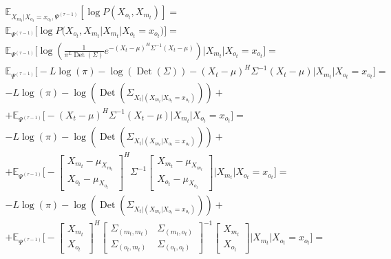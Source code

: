 \documentclass[11pt]{article}
\newcommand{\Expect}{\mathbb{E}}
\DeclareMathOperator{\Det}{Det}
\begin{document}
\begin{equation*}
\begin{gathered}
\Expect_{X_{m_t}|X_{o_t}=x_{o_t}, \Psi^{(\tau-1)}}[\log P(X_{o_t}, X_{m_t})]=\\
\Expect_{\Psi^{(\tau-1)}}\Big[\log P\Big(X_{o_t}, X_{m_t}\Big|X_{m_t}|X_{o_t}=x_{o_t}\Big)\Big]=\\
\Expect_{\Psi^{(\tau-1)}}\bigg[\log \left(\frac{1}{\pi^{L}\Det(\Sigma)}e^{-(X_t-\mu)^H\Sigma^{-1}(X_t-\mu)}\right)\Big|X_{m_t}|X_{o_t}=x_{o_t}\bigg]=\\
\Expect_{\Psi^{(\tau-1)}}\bigg[-L \log(\pi) - \log (\Det(\Sigma)) - (X_t - \mu)^H\Sigma^{-1}(X_t - \mu)\Big|X_{m_t}|X_{o_t}=x_{o_t}\bigg]=\\
-L \log(\pi) - \log (\Det(\Sigma_{X_t|(X_{m_t}|X_{o_t}=x_{o_t})})) + \\ + \Expect_{\Psi^{(\tau-1)}}\bigg[- (X_t - \mu)^H\Sigma^{-1}(X_t - \mu)\Big|X_{m_t}|X_{o_t}=x_{o_t}\bigg]=\\
-L \log(\pi) - \log (\Det(\Sigma_{X_t|(X_{m_t}|X_{o_t}=x_{o_t})}))  + \\ + \Expect_{\Psi^{(\tau-1)}}\bigg[- 
\begin{bmatrix} X_{m_t} - \mu_{X_{m_t}} \\  X_{o_t} - \mu_{X_{o_t}} \end{bmatrix}^H \Sigma^{-1}
\begin{bmatrix} X_{m_t} - \mu_{X_{m_t}} \\  X_{o_t} - \mu_{X_{o_t}} \end{bmatrix}\Big|X_{m_t}|X_{o_t}=x_{o_t}\bigg] = \\
-L \log(\pi) - \log (\Det(\Sigma_{X_t|(X_{m_t}|X_{o_t}=x_{o_t})}))  + \\ + \Expect_{\Psi^{(\tau-1)}}\bigg[- 
\begin{bmatrix} X_{m_t} \\  X_{o_t} \end{bmatrix}^H
\begin{bmatrix} \Sigma_{(m_t, m_t)} & \Sigma_{(m_t, o_t)} \\  \Sigma_{(o_t, m_t)} & \Sigma_{(o_t, o_t)} \end{bmatrix}^{-1}
\begin{bmatrix} X_{m_t} \\  X_{o_t} \end{bmatrix}\Big|X_{m_t}|X_{o_t}=x_{o_t}\bigg] = \\
\end{gathered}
\end{equation*}
\end{document}
